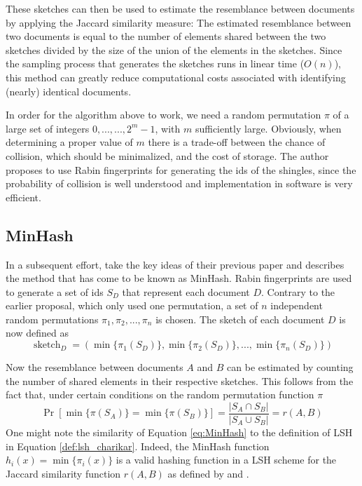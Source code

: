 These sketches can then be used to estimate the resemblance between documents by applying the Jaccard similarity measure: The estimated resemblance between two documents is equal to the number of elements shared between the two sketches divided by the size of the union of the elements in the sketches. 
Since the sampling process that generates the sketches runs in linear time ($O(n)$), this method can greatly reduce computational costs associated with identifying (nearly) identical documents.

In order for the algorithm above to work, we need a random permutation $\pi$ of a large set of integers ${0,...,...,2^{m}-1}$, with $m$ sufficiently large. Obviously, when determining a proper value of $m$ there is a trade-off between the chance of collision, which should be minimalized, and the cost of storage. The author proposes to use Rabin fingerprints \citep{Rabin1984} for generating the ids of the shingles, since the probability of collision is well understood and implementation in software is very efficient. 

\subsection{MinHash}
In a subsequent effort, \cite{Broder00} take the key ideas of their previous paper and describes the method that has come to be known as MinHash. Rabin fingerprints are used to generate a set of ids $S_D$ that represent each document $D$. Contrary to the earlier proposal, which only used one permutation, a set of $n$ independent random permutations $\pi_1,\pi_2,...,\pi_n$ is chosen. The sketch of each document $D$ is now defined as 
\begin{equation}
    \operatorname{sketch}_D = (\min\{\pi_1(S_D)\}, \min\{\pi_2(S_D)\},...,\min\{\pi_n(S_D)\})
\end{equation}

Now the resemblance between documents $A$ and $B$ can be estimated by counting the number of shared elements in their respective sketches. This follows from the fact that, under certain conditions on the random permutation function $\pi$
\begin{equation} \label{eq:MinHash}
    \operatorname{Pr}[\min\{\pi(S_A)\} =  \min\{\pi(S_B)\}] = \frac{|S_A\cap S_B|}{|S_A\cup S_B|} = r(A,B)
\end{equation}
One might note the similarity of Equation \ref{eq:MinHash} to the definition of LSH in Equation \ref{def:lsh_charikar}. Indeed, the MinHash function $h_i(x) = \min\{\pi_i(x)\}$ is a valid hashing function in a LSH scheme for the Jaccard similarity function $r(A,B)$ as defined by \cite{IndykM98} and \cite{Charikar02}.

